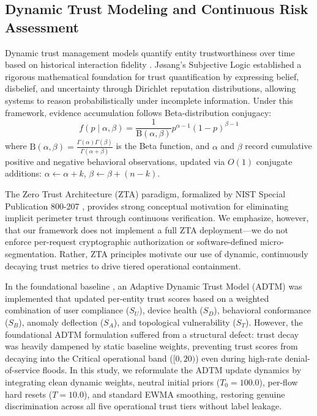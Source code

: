 \documentclass[journal,10pt,onecolumn]{IEEEtran}
\begin{document}
\subsection{Dynamic Trust Modeling and Continuous Risk Assessment}
Dynamic trust management models quantify entity trustworthiness over time based on historical interaction fidelity \cite{9, 10}. Jøsang's Subjective Logic \cite{9} established a rigorous mathematical foundation for trust quantification by expressing belief, disbelief, and uncertainty through Dirichlet reputation distributions, allowing systems to reason probabilistically under incomplete information. Under this framework, evidence accumulation follows Beta-distribution conjugacy:
$$f(p \mid \alpha, \beta) = \frac{1}{\mathrm{B}(\alpha, \beta)} p^{\alpha - 1} (1 - p)^{\beta - 1}$$
where $\mathrm{B}(\alpha, \beta) = \frac{\Gamma(\alpha)\Gamma(\beta)}{\Gamma(\alpha + \beta)}$ is the Beta function, and $\alpha$ and $\beta$ record cumulative positive and negative behavioral observations, updated via $O(1)$ conjugate additions: $\alpha \leftarrow \alpha + k$, $\beta \leftarrow \beta + (n - k)$.

The Zero Trust Architecture (ZTA) paradigm, formalized by NIST Special Publication 800-207 \cite{7}, provides strong conceptual motivation for eliminating implicit perimeter trust through continuous verification. We emphasize, however, that our framework does not implement a full ZTA deployment—we do not enforce per-request cryptographic authorization or software-defined micro-segmentation. Rather, ZTA principles motivate our use of dynamic, continuously decaying trust metrics to drive tiered operational containment.

In the foundational baseline \cite{1}, an Adaptive Dynamic Trust Model (ADTM) was implemented that updated per-entity trust scores based on a weighted combination of user compliance ($S_U$), device health ($S_D$), behavioral conformance ($S_B$), anomaly deflection ($S_A$), and topological vulnerability ($S_T$). However, the foundational ADTM formulation suffered from a structural defect: trust decay was heavily dampened by static baseline weights, preventing trust scores from decaying into the Critical operational band ($[0, 20)$) even during high-rate denial-of-service floods. In this study, we reformulate the ADTM update dynamics by integrating clean dynamic weights, neutral initial priors ($T_0 = 100.0$), per-flow hard resets ($T=10.0$), and standard EWMA smoothing, restoring genuine discrimination across all five operational trust tiers without label leakage.
\end{document}
